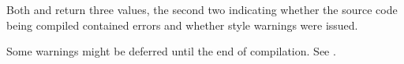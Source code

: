Both  and  return three
values, the second two indicating whether the source code being compiled
contained errors and whether style warnings were issued.
 
 
Some warnings might be deferred until the end of compilation. 
See .


\endsubSection%


